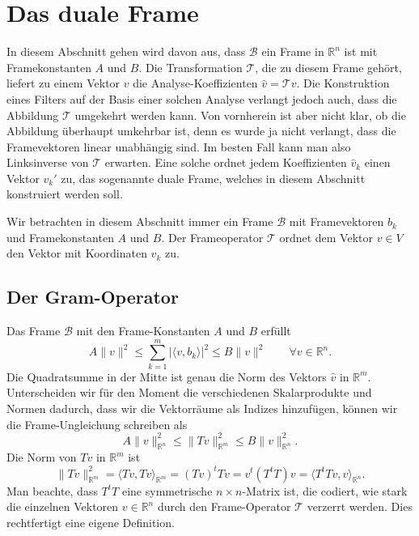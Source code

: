 %
%
%
\section{Das duale Frame\label{section:dual}}
In diesem Abschnitt gehen wird davon aus, dass $\mathcal{B}$ ein
Frame in $\mathbb{R}^n$ ist mit Framekonstanten $A$ und $B$.
Die Transformation $\mathcal{T}$, die zu diesem Frame gehört, liefert 
zu einem Vektor $v$ die Analyse-Koeffizienten $\hat{v} = \mathcal{T}v$.
Die Konstruktion eines Filters auf der Basis einer solchen Analyse verlangt
jedoch auch, dass die Abbildung $\mathcal{T}$ umgekehrt werden kann.
Von vornherein ist aber nicht klar, ob die Abbildung überhaupt umkehrbar ist,
denn es wurde ja nicht verlangt, dass die Framevektoren linear unabhängig
sind.
Im besten Fall kann man also Linksinverse von $\mathcal{T}$ erwarten.
Eine solche ordnet jedem Koeffizienten $\hat{v}_k$ einen Vektor $v_k'$
zu, das sogenannte duale Frame, welches in diesem Abschnitt konstruiert
werden soll.

Wir betrachten in diesem Abschnitt immer ein Frame $\mathcal{B}$
mit Framevektoren $b_k$ und Framekonstanten $A$ und $B$.
Der Frameoperator $\mathcal{T}$ ordnet dem Vektor $v\in V$ den Vektor
mit Koordinaten $\hat{v}_k$ zu.

\subsection{Der Gram-Operator}
Das Frame $\mathcal{B}$ mit den Frame-Konstanten $A$ und $B$ erfüllt
\[
A\|v\|^2 \le \sum_{k=1}^m |\langle v,b_k\rangle|^2 \le B\|v\|^2
\qquad\forall v\in \mathbb R^n.
\]
Die Quadratsumme in der Mitte ist genau die Norm des Vektors
$\hat{v}$ in $\mathbb R^m$.
Unterscheiden wir für den Moment die verschiedenen Skalarprodukte
und Normen dadurch, dass wir die Vektorräume als Indizes hinzufügen,
können wir die Frame-Ungleichung schreiben als
\[
A \| v\|_{\mathbb R^n}^2
\le
\| Tv\|_{\mathbb R^m}^2
\le
B \| v\|_{\mathbb R^n}^2.
\]
Die Norm von $Tv$ in $\mathbb R^m$ ist
\[
\| Tv\|_{\mathbb R^m}^2
=
\langle Tv,Tv\rangle_{\mathbb R^m}
=
(Tv)^tTv
=
v^t(T^tT)v
=
\langle T^tTv,v\rangle_{\mathbb R^n}.
\]
Man beachte, dass $T^tT$ eine symmetrische $n\times n$-Matrix ist,
die codiert, wie stark die einzelnen Vektoren $v\in\mathbb R^n$ durch
den Frame-Operator $\mathcal{T}$ verzerrt werden.
Dies rechtfertigt eine eigene Definition.

